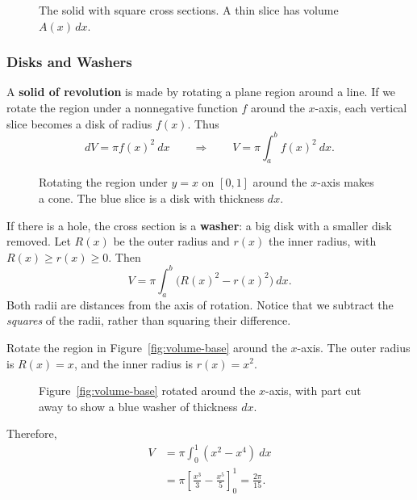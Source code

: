 \begin{figure}[H]
\centering

\caption{The solid with square cross sections. A thin slice has volume $A(x)\,dx$.}
\label{fig:square-cross-sections}
\end{figure}

\subsubsection{Disks and Washers}

A \textbf{solid of revolution} is made by rotating a plane region around
a line. If we rotate the region under a nonnegative function $f$ around
the $x$-axis, each vertical slice becomes a disk of radius $f(x)$. Thus
$$dV=\pi f(x)^2\ dx
\qquad\Longrightarrow\qquad
V=\pi\int_a^b f(x)^2\ dx.$$

\begin{figure}[H]
\centering

\caption{Rotating the region under $y=x$ on $[0,1]$ around the $x$-axis makes a cone. The blue slice is a disk with thickness $dx$.}
\label{fig:disk-slice}
\end{figure}

If there is a hole, the cross section is a \textbf{washer}: a big disk
with a smaller disk removed. Let $R(x)$ be the outer radius and $r(x)$
the inner radius, with $R(x)\geq r(x)\geq0$. Then
$$V=\pi\int_a^b\bigl(R(x)^2-r(x)^2\bigr)\ dx.$$
Both radii are distances from the axis of rotation. Notice that we
subtract the \textit{squares} of the radii, rather than squaring their
difference.

\begin{exampleblock}[breakable]
Rotate the region in Figure~\ref{fig:volume-base} around the $x$-axis.
The outer radius is $R(x)=x$, and the inner radius is $r(x)=x^2$.
\begin{figure}[H]
\centering

\caption{Figure~\ref{fig:volume-base} rotated around the $x$-axis, with part cut away to show a blue washer of thickness $dx$.}
\label{fig:washer-slice}
\end{figure}

Therefore,
$$\begin{aligned}
V&=\pi\int_0^1(x^2-x^4)\ dx\\
 &=\pi\left[\frac{x^3}{3}-\frac{x^5}{5}\right]_0^1
 =\frac{2\pi}{15}.
\end{aligned}$$
\end{exampleblock}

